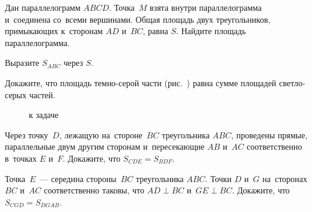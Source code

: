 \begin{problems}

\item
Дан параллелограмм $ABCD$.
Точка~$M$ взята внутри параллелограмма и~соединена со~всеми вершинами.
Общая площадь двух треугольников, примыкающих к~сторонам $AD$ и~$BC$,
равна $S$.
Найдите площадь параллелограмма.

\item
Выразите $S_{ABC}$ через $S$.
\begin{center}
\hfill
\hfill
\hfill
\hfill
\null\par
\hfill
\hfill
\hfill
\null
\end{center}



\item{}%
Докажите, что площадь темно-серой части
(рис.~)
равна сумме площадей светло-серых частей.

\begin{figure}[ht]
\begin{center}
    \caption{к задаче~}
\end{center}
\end{figure}

\item
Через точку~$D$, лежащую на~стороне~$BC$ треугольника $ABC$, проведены прямые,
параллельные двум другим сторонам и~пересекающие $AB$ и~$AC$ соответственно
в~точках $E$ и~$F$.
Докажите, что $S_{CDE} = S_{BDF}$.

\item
Точка~$E$~--- середина стороны~$BC$ треугольника $ABC$.
Точки $D$ и~$G$ на~сторонах $BC$ и~$AC$ соответственно таковы, что
$AD \perp BC$ и~$GE \perp BC$.
Докажите, что $S_{CGD} = S_{DGAB}$.


\end{problems}
